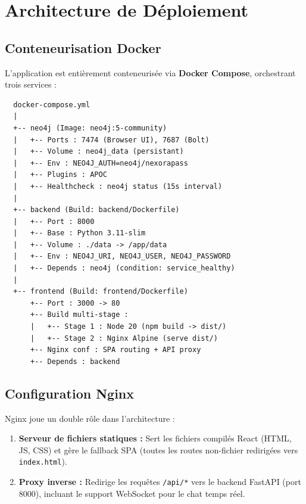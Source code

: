 \documentclass[12pt,a4paper]{article}
\begin{document}
\section{Architecture de Déploiement}

\subsection{Conteneurisation Docker}

L'application est entièrement conteneurisée via \textbf{Docker Compose}, orchestrant trois services :

\begin{verbatim}
  docker-compose.yml
  |
  +-- neo4j (Image: neo4j:5-community)
  |   +-- Ports : 7474 (Browser UI), 7687 (Bolt)
  |   +-- Volume : neo4j_data (persistant)
  |   +-- Env : NEO4J_AUTH=neo4j/nexorapass
  |   +-- Plugins : APOC
  |   +-- Healthcheck : neo4j status (15s interval)
  |
  +-- backend (Build: backend/Dockerfile)
  |   +-- Port : 8000
  |   +-- Base : Python 3.11-slim
  |   +-- Volume : ./data -> /app/data
  |   +-- Env : NEO4J_URI, NEO4J_USER, NEO4J_PASSWORD
  |   +-- Depends : neo4j (condition: service_healthy)
  |
  +-- frontend (Build: frontend/Dockerfile)
      +-- Port : 3000 -> 80
      +-- Build multi-stage :
      |   +-- Stage 1 : Node 20 (npm build -> dist/)
      |   +-- Stage 2 : Nginx Alpine (serve dist/)
      +-- Nginx conf : SPA routing + API proxy
      +-- Depends : backend
\end{verbatim}

\subsection{Configuration Nginx}

Nginx joue un double rôle dans l'architecture :

\begin{enumerate}
    \item \textbf{Serveur de fichiers statiques :} Sert les fichiers compilés React (HTML, JS, CSS) et gère le fallback SPA (toutes les routes non-fichier redirigées vers \texttt{index.html}).
    \item \textbf{Proxy inverse :} Redirige les requêtes \texttt{/api/*} vers le backend FastAPI (port 8000), incluant le support WebSocket pour le chat temps réel.
\end{enumerate}
\end{document}
